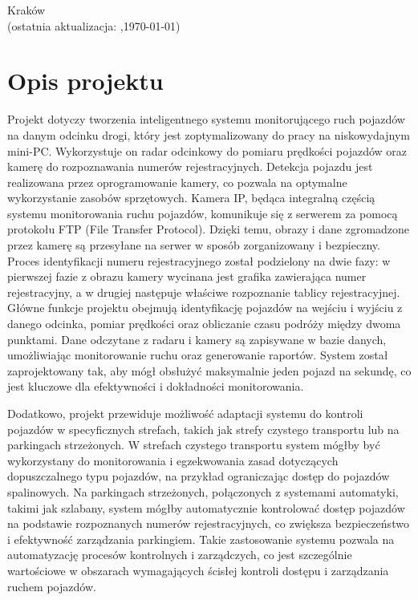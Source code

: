 \documentclass[12pt,a4paper,oneside]{article}
\theoremstyle{definition}
\numberwithin{equation}{section}
\begin{document}
\begin{titlepage}
\vspace*{\fill}
\begin{center}
\large
Kraków \the\year\\
(ostatnia aktualizacja: \DTMcurrenttime,\;\today)
\end{center}
\end{titlepage}
\setcounter{page}{0} 
\newpage\null\thispagestyle{empty}

\tableofcontents


\newpage

\section{Opis projektu}
Projekt dotyczy tworzenia inteligentnego systemu monitorującego ruch pojazdów na danym odcinku drogi, który jest zoptymalizowany do pracy na niskowydajnym mini-PC. Wykorzystuje on radar odcinkowy do pomiaru prędkości pojazdów oraz kamerę do rozpoznawania numerów rejestracyjnych. Detekcja pojazdu jest realizowana przez oprogramowanie kamery, co pozwala na optymalne wykorzystanie zasobów sprzętowych. Kamera IP, będąca integralną częścią systemu monitorowania ruchu pojazdów, komunikuje się z serwerem za pomocą protokołu FTP (File Transfer Protocol). Dzięki temu, obrazy i dane zgromadzone przez kamerę są przesyłane na serwer w sposób zorganizowany i bezpieczny. Proces identyfikacji numeru rejestracyjnego został podzielony na dwie fazy: w pierwszej fazie z obrazu kamery wycinana jest grafika zawierająca numer rejestracyjny, a w drugiej następuje właściwe rozpoznanie tablicy rejestracyjnej. Główne funkcje projektu obejmują identyfikację pojazdów na wejściu i wyjściu z danego odcinka, pomiar prędkości oraz obliczanie czasu podróży między dwoma punktami. Dane odczytane z radaru i kamery są zapisywane w bazie danych, umożliwiając monitorowanie ruchu oraz generowanie raportów. System został zaprojektowany tak, aby mógł obsłużyć maksymalnie jeden pojazd na sekundę, co jest kluczowe dla efektywności i dokładności monitorowania.

Dodatkowo, projekt przewiduje możliwość adaptacji systemu do kontroli pojazdów w specyficznych strefach, takich jak strefy czystego transportu lub na parkingach strzeżonych. W strefach czystego transportu system mógłby być wykorzystany do monitorowania i egzekwowania zasad dotyczących dopuszczalnego typu pojazdów, na przykład ograniczając dostęp do pojazdów spalinowych. Na parkingach strzeżonych, połączonych z systemami automatyki, takimi jak szlabany, system mógłby automatycznie kontrolować dostęp pojazdów na podstawie rozpoznanych numerów rejestracyjnych, co zwiększa bezpieczeństwo i efektywność zarządzania parkingiem. Takie zastosowanie systemu pozwala na automatyzację procesów kontrolnych i zarządczych, co jest szczególnie wartościowe w obszarach wymagających ścisłej kontroli dostępu i zarządzania ruchem pojazdów.
\end{document}
